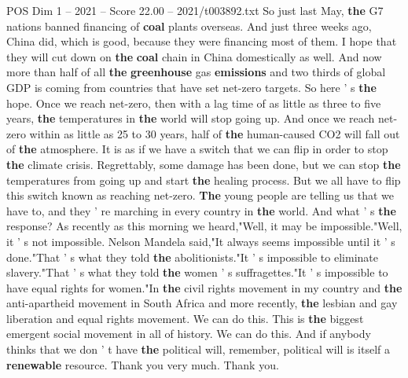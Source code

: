 \begin{textsample}{POS Dim 1 – 2021 – Score 22.00 – 2021/t003892.txt}
So just last May, \textbf{the} G7 nations banned financing of \textbf{coal} plants overseas.
And just three weeks ago, China did, which is good, because they were financing most of them.
I hope that they will cut down on \textbf{the} \textbf{coal} chain in China domestically as well.
And now more than half of all \textbf{the} \textbf{greenhouse} gas \textbf{emissions} and two thirds of global GDP is coming from countries that have set net-zero targets.
So here ' s \textbf{the} hope.
Once we reach net-zero, then with a lag time of as little as three to five years, \textbf{the} temperatures in \textbf{the} world will stop going up.
And once we reach net-zero within as little as 25 to 30 years, half of \textbf{the} human-caused CO2 will fall out of \textbf{the} atmosphere.
It is as if we have a switch that we can flip in order to stop \textbf{the} climate crisis.
Regrettably, some damage has been done, but we can stop \textbf{the} temperatures from going up and start \textbf{the} healing process.
But we all have to flip this switch known as reaching net-zero. \textbf{The} young people are telling us that we have to, and they ' re marching in every country in \textbf{the} world.
And what ' s \textbf{the} response?
As recently as this morning we heard,"Well, it may be impossible."Well, it ' s not impossible.
Nelson Mandela said,"It always seems impossible until it ' s done."That ' s what they told \textbf{the} abolitionists."It ' s impossible to eliminate slavery."That ' s what they told \textbf{the} women ' s suffragettes."It ' s impossible to have equal rights for women."In \textbf{the} civil rights movement in my country and \textbf{the} anti-apartheid movement in South Africa and more recently, \textbf{the} lesbian and gay liberation and equal rights movement.
We can do this.
This is \textbf{the} biggest emergent social movement in all of history.
We can do this.
And if anybody thinks that we don ' t have \textbf{the} political will, remember, political will is itself a \textbf{renewable} resource.
Thank you very much.
Thank you.

\end{textsample}
